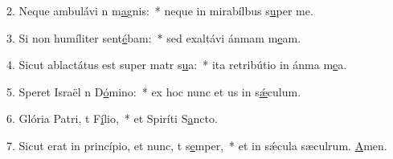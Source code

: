 2. Neque ambulávi n m\uline{a}gnis:~* neque in mirabílbus s\uline{u}per me.\par 
3. Si non humíliter sent\uline{é}bam:~* sed exaltávi ánmam m\uline{e}am.\par 
4. Sicut ablactátus est super matr s\uline{u}a:~* ita retribútio in ánma m\uline{e}a.\par 
5. Speret Israël n D\uline{ó}mino:~* ex hoc nunc et us in s\uline{ǽ}culum.\par 
6. Glória Patri, t F\uline{í}lio,~* et Spiríti S\uline{a}ncto.\par 
7. Sicut erat in princípio, et nunc, t s\uline{e}mper,~* et in sǽcula sæculrum. \uline{A}men.\par 
